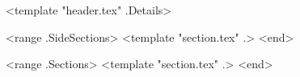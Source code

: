 \documentclass[letterpaper]{article}
\begin{document}
<template "header.tex" .Details>
\begin{minipage}[t]{0.33\textwidth}
<range .SideSections>
<template "section.tex" .>
<end>
\end{minipage}
\begin{minipage}[t]{0.67\textwidth}
<range .Sections>
<template "section.tex" .>
<end>
\end{minipage}
\end{document}
